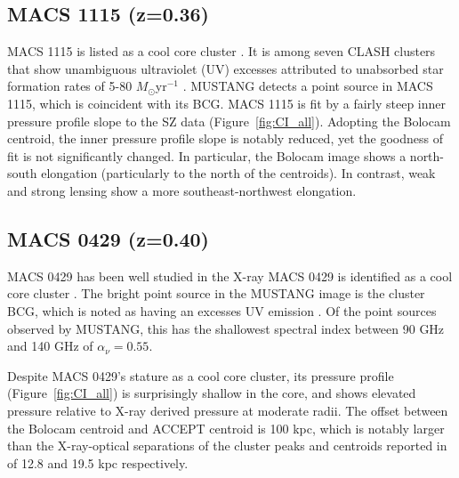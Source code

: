 \documentclass[iop,numberedappendix,apj]{emulateapj}
\begin{document}

\subsection{MACS 1115 (z=0.36)}
\label{sec:results_m1115}


MACS 1115 is listed as a cool core cluster \citep{sayers2013}. It is among seven CLASH clusters that show
unambiguous ultraviolet (UV) excesses attributed to unabsorbed star formation rates of 5-80 $M_{\odot} $yr$^{-1}$
\citep{donahue2015}. MUSTANG detects a point source in MACS 1115, which is coincident with its BCG. 
MACS 1115 is fit by a fairly steep inner pressure profile slope to the SZ data (Figure~\ref{fig:CI_all}).
Adopting the Bolocam centroid, the inner pressure profile slope is notably reduced, yet the goodness of fit is
not significantly changed. In particular, the Bolocam image shows a north-south elongation (particularly to the
north of the centroids). In contrast, weak and strong lensing \citep{zitrin2015} show a more southeast-northwest
elongation.


\subsection{MACS 0429 (z=0.40)}
\label{sec:results_m0429}


MACS 0429 has been well studied in the X-ray \citep{schmidt2007,comerford2007,maughan2008,allen2008,mann2012}
MACS 0429 is identified as a cool core cluster \citep[cf.][]{mann2012,sayers2013}. The bright point source in 
the MUSTANG image is the cluster BCG, which is noted as having an excesses UV emission \citep{donahue2015}.
Of the point sources observed by MUSTANG, this has the shallowest spectral index between 90 GHz and 140 GHz
of $\alpha_{\nu} = 0.55$.

Despite MACS 0429's stature as a cool core cluster, its pressure profile
(Figure~\ref{fig:CI_all}) is surprisingly shallow in the core, and shows elevated pressure relative to
X-ray derived pressure at moderate radii. The offset between the Bolocam centroid \citep{sayers2013} and ACCEPT
\citep{cavagnolo2009} centroid is 100 kpc, which is notably larger than the X-ray-optical separations of the cluster
peaks and centroids reported in \citet{mann2012} of 12.8 and 19.5 kpc respectively.
\end{document}
